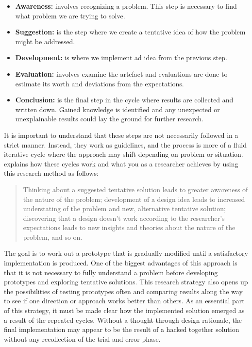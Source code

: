 \begin{itemize}
    \item\textbf{Awareness:} involves recognizing a problem. This step is necessary to find what problem we are trying to solve.
    \item\textbf{Suggestion:} is the step where we create a tentative idea of how the problem might be addressed.
    \item\textbf{Development:} is where we implement ad idea from the previous step.
    \item\textbf{Evaluation:} involves examine the artefact and evaluations are done to estimate its worth and deviations from the expectations.
    \item\textbf{Conclusion:} is the final step in the cycle where results are collected and written down. Gained knowledge is identified and any unexpected or unexplainable results could lay the ground for further research.
\end{itemize}

It is important to understand that these steps are not necessarily followed in a strict manner. Instead, they work as guidelines, and the process is more of a fluid iterative cycle where the approach may shift depending on problem or situation. \citep{oates2005researching} explains how these cycles work and what you as a researcher achieves by using this research method as follows:

\begin{quote}
    Thinking about a suggested tentative solution leads to greater awareness of the nature of the problem; development of a design idea leads to increased understating of the problem and new, alternative tentative solution; discovering that a design doesn't work according to the researcher's expectations leads to new insights and theories about the nature of the problem, and so on. 
\end{quote}

The goal is to work out a prototype that is gradually modified until a satisfactory implementation is produced. One of the biggest advantages of this approach is that it is not necessary to fully understand a problem before developing prototypes and exploring tentative solutions. This research strategy also opens up the possibilities of testing prototypes often and comparing results along the way to see if one direction or approach works better than others. As an essential part of this strategy, it must be made clear how the implemented solution emerged as a result of the repeated cycles. Without a thought-through design rationale, the final implementation may appear to be the result of a hacked together solution without any recollection of the trial and error phase.


